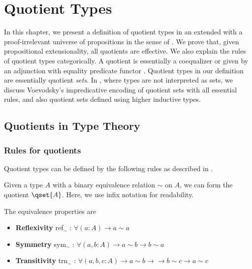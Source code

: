 \chapter{Quotient Types}
\label{qt}




In this chapter, we present a definition of quotient types in an \itt extended with a proof-irrelevant universe of propositions in the sense of . We prove that, given propositional extensionality, all quotients are effective. 
We also explain the rules of quotient types categorically. 
A quotient is essentially a coequalizer or given by an adjunction with equality predicate functor \cite{Jacobs94quotientsin}. 
Quotient types in our definition are essentially quotient \emph{sets}. In \hott, where types are not interpreted as sets, we discuss Voevodsky's impredicative encoding of quotient sets with all essential rules, and also quotient sets defined using higher inductive types. 

\section{Quotients in Type Theory}

\subsection{Rules for quotients}\label{iqs}

Quotient types can be defined by the following rules as described in \cite{Jacobs94quotientsin,hof:95:sm}. 


{\Gamma \vdash {}}

Given a type $A$ with a binary equivalence relation $\sim$ on $A$, we can form the quotient $\qset{A}$. Here, we use infix notation for readability.

The equivalence properties are

\begin{itemize}
\item \textbf{Reflexivity} ref$_{\sim}$ : $\forall (a : A) \to a \sim a$
\item \textbf{Symmetry} sym$_{\sim}$ : $\forall (a,b : A) \to a \sim b \to b \sim a$
\item \textbf{Transitivity} trn$_{\sim}$ : $\forall (a,b,c : A) \to a \sim b \to \to b \sim c \to a \sim c$
\end{itemize}

